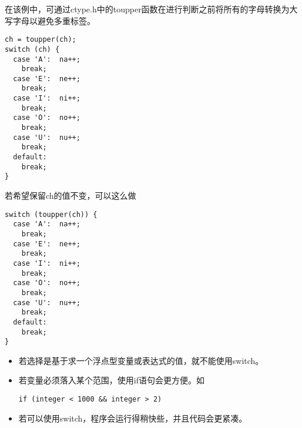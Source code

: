 \begin{frame}[fragile]\ft{\secname}
在该例中，可通过ctype.h中的toupper函数在进行判断之前将所有的字母转换为大写字母以避免多重标签。
\end{frame}

\begin{frame}[fragile]\ft{\secname}
\begin{lstlisting}
ch = toupper(ch);
switch (ch) {
  case 'A':  na++;
    break;
  case 'E':  ne++;
    break;
  case 'I':  ni++;
    break;
  case 'O':  no++;
    break;
  case 'U':  nu++;
    break;
  default:
    break;
}   
\end{lstlisting}           
\end{frame}

\begin{frame}[fragile]\ft{\secname}
若希望保留ch的值不变，可以这么做
\begin{lstlisting}
switch (toupper(ch)) {
  case 'A':  na++;
    break;
  case 'E':  ne++;
    break;
  case 'I':  ni++;
    break;
  case 'O':  no++;
    break;
  case 'U':  nu++;
    break;
  default:
    break;
}
\end{lstlisting}  
\end{frame}

\begin{frame}[fragile]
\begin{itemize}
\item
若选择是基于求一个浮点型变量或表达式的值，就不能使用switch。\\[0.1in]
\item
若变量必须落入某个范围，使用if语句会更方便。如
\begin{lstlisting}
if (integer < 1000 && integer > 2)  
\end{lstlisting}
\vspace{0.1in}
\item 若可以使用switch，程序会运行得稍快些，并且代码会更紧凑。 
\end{itemize}         
\end{frame}




